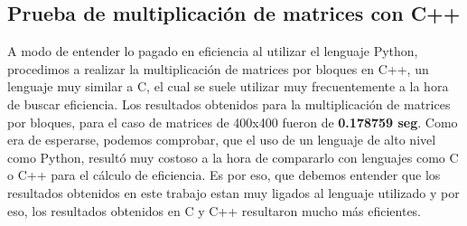 \subsection{Prueba de multiplicación de matrices con C++}
    A modo de entender lo pagado en eficiencia al utilizar el lenguaje Python, 
    procedimos a realizar la multiplicación de matrices por bloques en C++, un lenguaje
    muy similar a C, el cual se suele utilizar muy frecuentemente a la hora de buscar
    eficiencia.
    Los resultados obtenidos para la multiplicación de matrices por bloques, para el caso
    de matrices de 400x400 fueron de \textbf{0.178759 seg}. Como era de esperarse, podemos 
    comprobar, que el uso de un lenguaje de alto nivel como Python, resultó muy costoso a
    la hora de compararlo con lenguajes como C o C++ para el cálculo de eficiencia.
    Es por eso, que debemos entender que los resultados obtenidos en este trabajo estan
    muy ligados al lenguaje utilizado y por eso, los resultados obtenidos en C y C++ resultaron
    mucho más eficientes.
